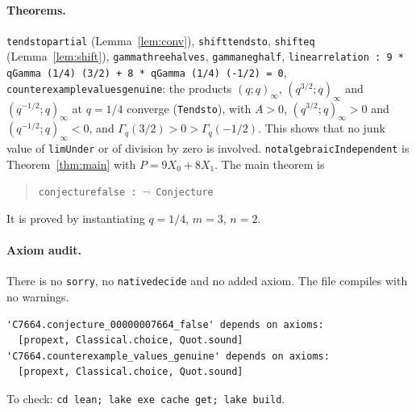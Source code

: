 \documentclass[11pt]{article}
\theoremstyle{definition}
\theoremstyle{remark}
\renewcommand{\_}{\oldus\allowbreak}
\begin{document}
\paragraph{Theorems.}
\texttt{tendsto\_partial} (Lemma~\ref{lem:conv}), \texttt{shift\_tendsto}, \texttt{shift\_eq}
(Lemma~\ref{lem:shift}), \texttt{gamma\_three\_halves}, \texttt{gamma\_neg\_half},
\texttt{linear\_relation : 9 * qGamma (1/4) (3/2) + 8 * qGamma (1/4) (-1/2) = 0},
\texttt{counterexample\_values\_genuine}: the products $(q;q)_\infty$, $(q^{3/2};q)_\infty$ and
$(q^{-1/2};q)_\infty$ at $q = 1/4$ converge (\texttt{Tendsto}), with $A > 0$, $(q^{3/2};q)_\infty > 0$
and $(q^{-1/2};q)_\infty < 0$, and $\Gamma_q(3/2) > 0 > \Gamma_q(-1/2)$. This shows that no junk value
of \texttt{limUnder} or of division by zero is involved.
\texttt{not\_algebraicIndependent} is Theorem~\ref{thm:main} with $P = 9X_0 + 8X_1$. The main theorem is
\begin{quote}
\texttt{conjecture\_00000007664\_false : $\neg$ Conjecture}
\end{quote}
It is proved by instantiating $q = 1/4$, $m = 3$, $n = 2$.

\paragraph{Axiom audit.} There is no \texttt{sorry}, no \texttt{native\_decide} and no added axiom.
The file compiles with no warnings.
\begin{verbatim}
'C7664.conjecture_00000007664_false' depends on axioms:
  [propext, Classical.choice, Quot.sound]
'C7664.counterexample_values_genuine' depends on axioms:
  [propext, Classical.choice, Quot.sound]
\end{verbatim}
To check: \texttt{cd lean; lake exe cache get; lake build}.
\end{document}
